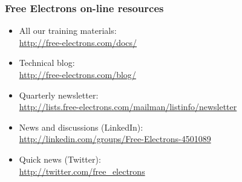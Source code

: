 \begin{frame}
\frametitle{Free Electrons on-line resources}
  \begin{itemize}
    \item All our training materials:\\
          \url{http://free-electrons.com/docs/}
    \item Technical blog:\\
          \url{http://free-electrons.com/blog/} 
    \item Quarterly newsletter:\\
 	  \url{http://lists.free-electrons.com/mailman/listinfo/newsletter}
    \item News and discussions (LinkedIn):\\
	  \url{http://linkedin.com/groups/Free-Electrons-4501089}
    \item Quick news (Twitter):\\
          \url{http://twitter.com/free_electrons}
  \end{itemize}
\end{frame}
